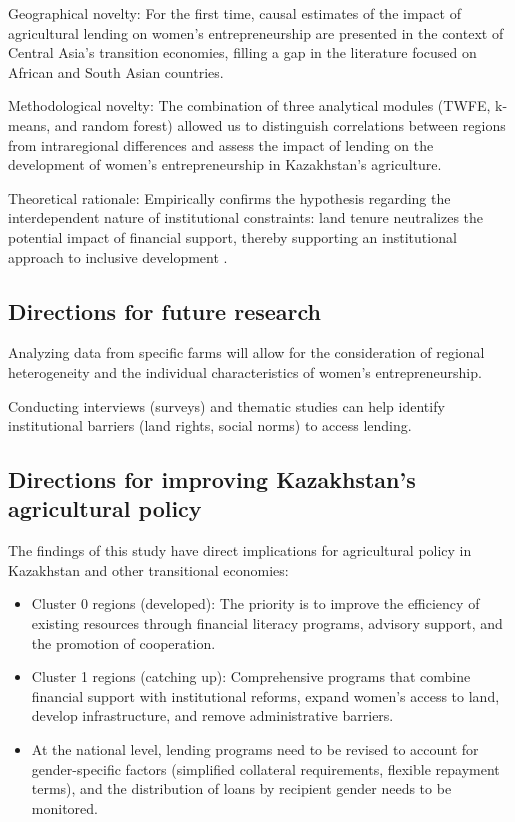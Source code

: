 ﻿\documentclass[pdflatex,sn-mathphys-ay]{sn-jnl}
\begin{document}
Geographical novelty: For the first time, causal estimates of the impact
of agricultural lending on women's entrepreneurship are presented in the
context of Central Asia's transition economies, filling a gap in the
literature focused on African and South Asian countries.

Methodological novelty: The combination of three analytical modules
(TWFE, k-means, and random forest) allowed us to distinguish
correlations between regions from intraregional differences and assess
the impact of lending on the development of women's entrepreneurship in
Kazakhstan's agriculture.

Theoretical rationale: Empirically confirms the hypothesis regarding the
interdependent nature of institutional constraints: land tenure
neutralizes the potential impact of financial support, thereby
supporting an institutional approach to inclusive development
\citep{ref78,ref90}.

\subsection{Directions for future research}

Analyzing data from specific farms will allow for the consideration of
regional heterogeneity and the individual characteristics of women's
entrepreneurship.

Conducting interviews (surveys) and thematic studies can help identify
institutional barriers (land rights, social norms) to access lending.

\subsection{Directions for improving Kazakhstan's agricultural policy}

The findings of this study have direct implications for agricultural
policy in Kazakhstan and other transitional economies:

\begin{itemize}
\item Cluster 0 regions (developed): The priority is to improve the
efficiency of existing resources through financial literacy programs,
advisory support, and the promotion of cooperation.
\item Cluster 1 regions (catching up): Comprehensive programs that
combine financial support with institutional reforms, expand women's
access to land, develop infrastructure, and remove administrative
barriers.
\item At the national level, lending programs need to be revised to
account for gender-specific factors (simplified collateral
requirements, flexible repayment terms), and the distribution of loans by
recipient gender needs to be monitored.
\end{itemize}
\end{document}
